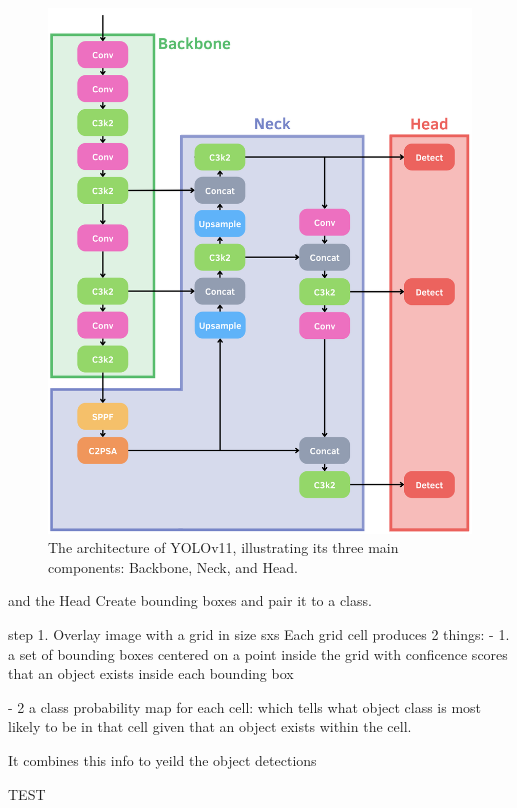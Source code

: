 \documentclass[a4paper,10pt,twocolumn]{article}
\numberwithin{figure}{section}
\numberwithin{table}{section}
\begin{document}
\begin{figure}[h]
    \centering
    \includegraphics[width=1\linewidth]{YOLOARC.png}  %
    \caption{The architecture of YOLOv11, illustrating its three main components: Backbone, Neck, and Head.}
    \label{fig:Arc}  
\end{figure}

and the Head 
Create bounding boxes and pair it to a class.

step 1. Overlay image with a grid in size sxs 
Each grid cell produces 2 things:
- 1. a set of bounding boxes centered on a point inside the grid
 with conficence scores that an object exists inside each bounding box 

 - 2 a class probability map for each cell: which tells what object class is most 
 likely to be in that cell given that an object exists within the cell.

It combines this info to yeild the object detections 



TEST
\end{document}
